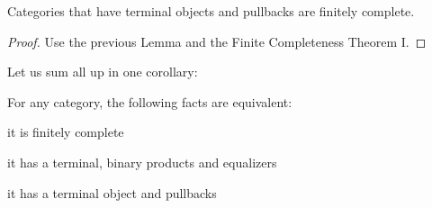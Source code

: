 \begin{proposition}
  Categories that have terminal objects and pullbacks are finitely
  complete.
\end{proposition}

\begin{proof}
  Use the previous Lemma and the Finite Completeness Theorem I.
\end{proof}

Let us sum all up in one corollary:

\begin{corollary}
  For any category, the following facts are equivalent:
  \begin{tcbenum}
  \item it is finitely complete
  \item it has a terminal, binary products and equalizers
  \item it has a terminal object and pullbacks
  \end{tcbenum}
\end{corollary}


